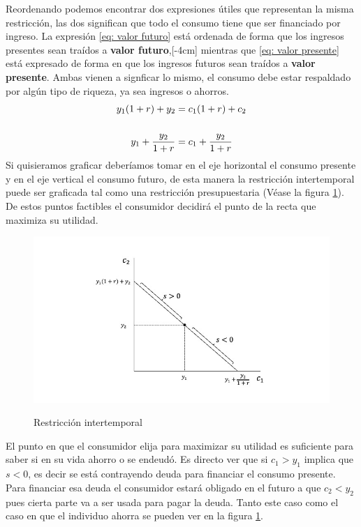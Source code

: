 Reordenando podemos encontrar dos expresiones útiles que representan la misma restricción, las dos significan que todo el consumo tiene que ser financiado por ingreso. La expresión \ref{eq: valor futuro} está ordenada de forma que los ingresos presentes sean traídos a \textbf{valor futuro},[-4cm] mientras que \ref{eq: valor presente} está expresado de forma en que los ingresos futuros sean traídos a \textbf{valor presente}. Ambas vienen a signficar lo mismo, el consumo debe estar respaldado por algún tipo de riqueza, ya sea ingresos o ahorros.
\begin{align}
    y_1(1+r) + y_2 &= c_1(1+r) + c_2 \label{eq: valor futuro} \\
    \quad & \quad \notag\\
    y_1 + \frac{y_2}{1+r} &= c_1 + \frac{y_2}{1+r} \label{eq: valor presente}
\end{align}
Si quisieramos graficar deberíamos tomar en el eje horizontal el consumo presente y en el eje vertical el consumo futuro, de esta manera la restricción intertemporal puede ser graficada tal como una restricción presupuestaria (Véase la figura \ref{fig: restricción intertemporal}). De estos puntos factibles el consumidor decidirá el punto de la recta que maximiza su utilidad.
\begin{figure}
    \centering
    \caption{Restricción intertemporal}
    \includegraphics[width=\textwidth]{Figuras/CI Restriccion intertemporal.jpeg}
    \label{fig: restricción intertemporal}
\end{figure}
El punto en que el consumidor elija para maximizar su utilidad es suficiente para saber si en su vida ahorro o se endeudó. Es directo ver que si $c_1>y_1$ implica que $s<0$, es decir se está contrayendo deuda para financiar el consumo presente. Para financiar esa deuda el consumidor estará obligado en el futuro a que $c_2<y_2$ pues cierta parte va a ser usada para pagar la deuda. Tanto este caso como el caso en que el individuo ahorra se pueden ver en la figura \ref{fig: restricción intertemporal}. 

